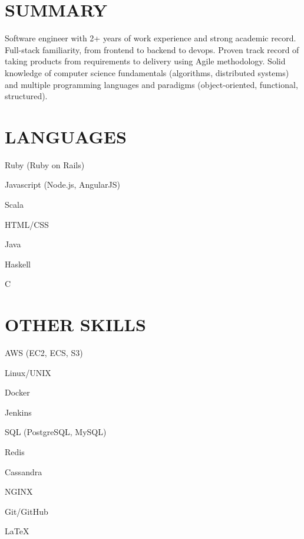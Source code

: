 \documentclass[resmargin]{res}
\begin{document}

    \address{}
    \address{}

    \begin{resume}

      \section{SUMMARY}
      \noindent Software engineer with 2+ years of work experience and strong academic record. Full-stack familiarity, from frontend to backend to devops. Proven track record of taking products from requirements to delivery using Agile methodology. Solid knowledge of computer science fundamentals (algorithms, distributed systems) and multiple programming languages and paradigms (object-oriented, functional, structured).

      \section{LANGUAGES}
      \begin{itemize*}[itemjoin=\hspace{2ex}]
        \item Ruby (Ruby on Rails)
        \item Javascript (Node.js, AngularJS)
        \item Scala
        \item HTML/CSS
        \item Java
        \item Haskell
        \item C
      \end{itemize*}

      \section{OTHER SKILLS}
      \begin{itemize*}[itemjoin=\hspace{2ex}]
        \item AWS (EC2, ECS, S3)
        \item Linux/UNIX
        \item Docker
        \item Jenkins
        \item SQL (PostgreSQL, MySQL)
        \item Redis
        \item Cassandra
        \item NGINX
        \item Git/GitHub
        \item \LaTeX
      \end{itemize*}


\end{resume}
\end{document}
